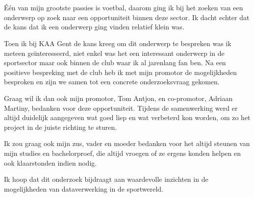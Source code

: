 
\chapter*{}%
\label{ch:voorwoord}


Één van mijn grootste passies is voetbal, daarom ging ik bij het zoeken van een onderwerp op zoek naar een opportuniteit binnen deze sector. Ik dacht echter dat de kans dat ik een onderwerp ging vinden relatief klein was. 

Toen ik bij KAA Gent de kans kreeg om dit onderwerp te bespreken was ik meteen geïnteresseerd, niet enkel was het een interessant onderwerp in de sportsector maar ook binnen de club waar ik al jarenlang fan ben. Na een positieve bespreking met de club heb ik met mijn promotor de mogelijkheden besproken en zijn we samen tot een concrete onderzoeksvraag gekomen.

Graag wil ik dan ook mijn promotor, Tom Antjon, en co-promotor, Adriaan Martiny, bedanken voor deze opportuniteit. Tijdens de samenwerking werd er altijd duidelijk aangegeven wat goed liep en wat verbeterd kon worden, om zo het project in de juiste richting te sturen.

Ik zou graag ook mijn zus, vader en moeder bedanken voor het altijd steunen van mijn studies en bachelorproef, die altijd vroegen of ze ergens konden helpen en ook klaarstonden indien nodig.

Ik hoop dat dit onderzoek bijdraagt aan waardevolle inzichten in de mogelijkheden van dataverwerking in de sportwereld.